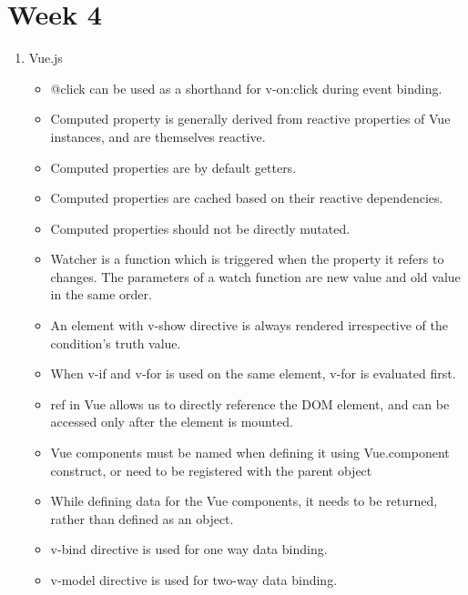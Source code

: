 \documentclass[a4paper]{article}
\begin{document}
\section{Week 4}
\begin{enumerate}
    \item Vue.js
    \begin{itemize}
        \item @click  can be used as a shorthand for v-on:click during event binding.
        \item Computed property is generally derived from reactive properties of Vue instances, and are themselves reactive.
        \item Computed properties are by default getters.
        \item Computed properties are cached based on their reactive dependencies.
        \item Computed properties  should not be directly mutated.
        \item Watcher is a function which is triggered when the property it refers to changes. The parameters of a watch function are new value  and old value  in the same order.
        \item An element with v-show directive is always rendered irrespective of the condition’s truth value.
        \item When v-if and v-for  is used on the same element, v-for is evaluated first.
        \item ref in Vue allows us to directly reference the DOM element, and can be accessed only after the element is mounted.
        \item Vue components must be named when defining it using Vue.component construct, or need to be registered with the parent object
        \item While defining data for the Vue components, it needs to be returned, rather than defined as an object.
        \item v-bind  directive is used for one way data binding.
        \item v-model directive is used for two-way data binding.
    \end{itemize}
\end{enumerate}
\end{document}
